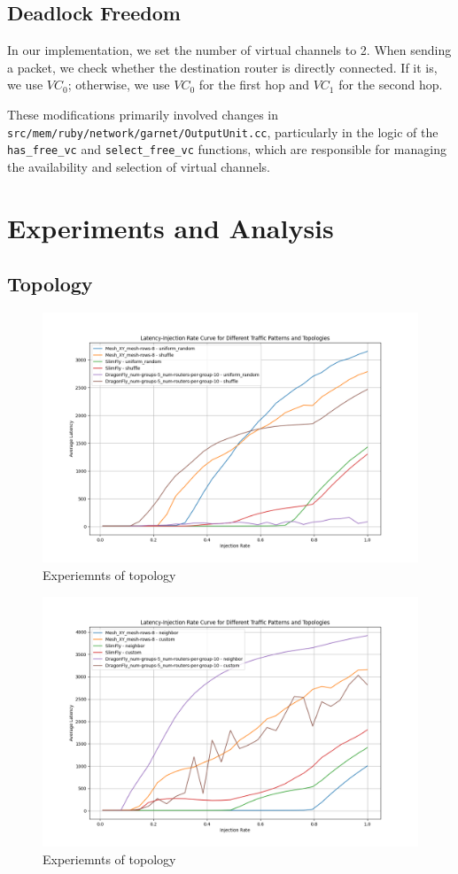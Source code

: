 \documentclass[utf8]{article}
\begin{document}
\subsection{Deadlock Freedom}

In our implementation, we set the number of virtual channels to 2. When sending a packet, we check whether the destination router is directly connected. If it is, we use \(VC_0\); otherwise, we use \(VC_0\) for the first hop and \(VC_1\) for the second hop.

These modifications primarily involved changes in \texttt{src/mem/ruby/network/garnet/OutputUnit.cc}, particularly in the logic of the \texttt{has\_free\_vc} and \texttt{select\_free\_vc} functions, which are responsible for managing the availability and selection of virtual channels.

\section{Experiments and Analysis}

\subsection{Topology}

\begin{figure}[H]
    \centering
    \includegraphics[width=0.85\linewidth]{topology_1.png}
    \caption{Experiemnts of topology}
\end{figure}

\begin{figure}[H]
    \centering
    \includegraphics[width=0.85\linewidth]{topology_2.png}
    \caption{Experiemnts of topology}
\end{figure}
\end{document}
